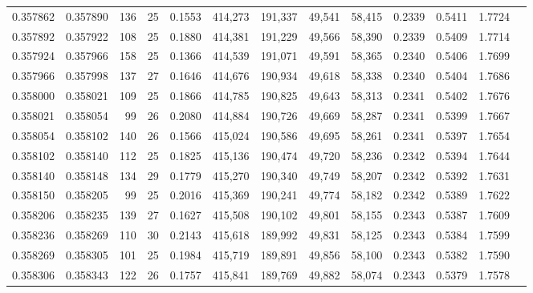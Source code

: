 \begin{tabular}{rrrrrrrrrrrrr}
0.357862 & 0.357890 &   136 &  25 &                                     0.1553 & 414,273 & 191,337 &  49,541 &  58,415 & 0.2339 & 0.5411 & 1.7724 \\
0.357892 & 0.357922 &   108 &  25 &                                     0.1880 & 414,381 & 191,229 &  49,566 &  58,390 & 0.2339 & 0.5409 & 1.7714 \\
0.357924 & 0.357966 &   158 &  25 &                                     0.1366 & 414,539 & 191,071 &  49,591 &  58,365 & 0.2340 & 0.5406 & 1.7699 \\
0.357966 & 0.357998 &   137 &  27 &                                     0.1646 & 414,676 & 190,934 &  49,618 &  58,338 & 0.2340 & 0.5404 & 1.7686 \\
0.358000 & 0.358021 &   109 &  25 &                                     0.1866 & 414,785 & 190,825 &  49,643 &  58,313 & 0.2341 & 0.5402 & 1.7676 \\
0.358021 & 0.358054 &    99 &  26 &                                     0.2080 & 414,884 & 190,726 &  49,669 &  58,287 & 0.2341 & 0.5399 & 1.7667 \\
0.358054 & 0.358102 &   140 &  26 &                                     0.1566 & 415,024 & 190,586 &  49,695 &  58,261 & 0.2341 & 0.5397 & 1.7654 \\
0.358102 & 0.358140 &   112 &  25 &                                     0.1825 & 415,136 & 190,474 &  49,720 &  58,236 & 0.2342 & 0.5394 & 1.7644 \\
0.358140 & 0.358148 &   134 &  29 &                                     0.1779 & 415,270 & 190,340 &  49,749 &  58,207 & 0.2342 & 0.5392 & 1.7631 \\
0.358150 & 0.358205 &    99 &  25 &                                     0.2016 & 415,369 & 190,241 &  49,774 &  58,182 & 0.2342 & 0.5389 & 1.7622 \\
0.358206 & 0.358235 &   139 &  27 &                                     0.1627 & 415,508 & 190,102 &  49,801 &  58,155 & 0.2343 & 0.5387 & 1.7609 \\
0.358236 & 0.358269 &   110 &  30 &                                     0.2143 & 415,618 & 189,992 &  49,831 &  58,125 & 0.2343 & 0.5384 & 1.7599 \\
0.358269 & 0.358305 &   101 &  25 &                                     0.1984 & 415,719 & 189,891 &  49,856 &  58,100 & 0.2343 & 0.5382 & 1.7590 \\
0.358306 & 0.358343 &   122 &  26 &                                     0.1757 & 415,841 & 189,769 &  49,882 &  58,074 & 0.2343 & 0.5379 & 1.7578 \\

\end{tabular}
